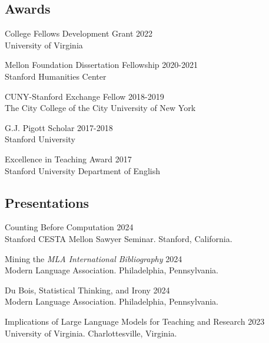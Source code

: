 \documentclass[
  12pt,
  letterpaper,
]{article}
\begin{document}
\hypertarget{awards}{%
\subsection{Awards}\label{awards}}

College Fellows Development Grant \hfill 2022\\
\hspace*{0.333em} University of Virginia

Mellon Foundation Dissertation Fellowship \hfill 2020-2021\\
\hspace*{0.333em} Stanford Humanities Center

CUNY-Stanford Exchange Fellow \hfill 2018-2019\\
\hspace*{0.333em} The City College of the City University of New York

G.J. Pigott Scholar \hfill 2017-2018\\
\hspace*{0.333em} Stanford University

Excellence in Teaching Award \hfill 2017\\
\hspace*{0.333em} Stanford University Department of English

\hypertarget{presentations}{%
\subsection{Presentations}\label{presentations}}

Counting Before Computation \hfill 2024\\
\hspace*{0.333em} Stanford CESTA Mellon Sawyer Seminar. Stanford, California.

Mining the \emph{MLA International Bibliography} \hfill 2024\\
\hspace*{0.333em} Modern Language Association. Philadelphia, Pennsylvania.

Du Bois, Statistical Thinking, and Irony \hfill 2024\\
\hspace*{0.333em} Modern Language Association. Philadelphia, Pennsylvania.

Implications of Large Language Models for Teaching and Research \hfill 2023\\
\hspace*{0.333em} University of Virginia. Charlottesville, Virginia.
\end{document}
